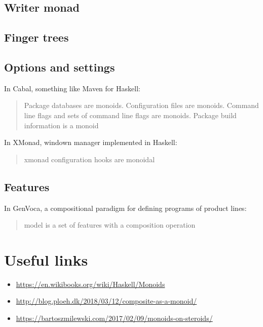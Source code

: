 \documentclass{article}
\begin{document}
    \subsection{Writer monad}

    \subsection{Finger trees}

    \subsection{Options and settings}

    In Cabal, something like Maven for Haskell: 

    \blockquote{Package databases are monoids. Configuration files are monoids. Command line flags and sets of command line flags are monoids. Package build information is a monoid}

    In XMonad, windown manager implemented in Haskell:

    \blockquote{xmonad configuration hooks are monoidal}

    \subsection{Features}

    In GenVoca, a compositional paradigm for defining programs of product lines:

    \blockquote{model is a set of features with a composition operation}

    \newpage

    \section{Useful links}

    \begin{itemize}
        \item \url{https://en.wikibooks.org/wiki/Haskell/Monoids}
        \item \url{http://blog.ploeh.dk/2018/03/12/composite-as-a-monoid/}
        \item \url{https://bartoszmilewski.com/2017/02/09/monoids-on-steroids/}
    \end{itemize}
\end{document}
